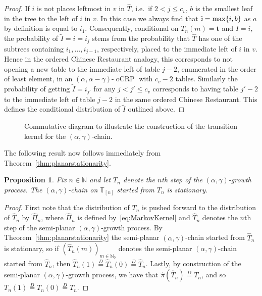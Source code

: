 \documentclass[a4paper, final]{amsart}
\theoremstyle{plain}
\newtheorem{prop}[thm]{Proposition}
\theoremstyle{definition}
\newcommand{\tree}[1][t]{\boldsymbol{#1}}
\newcommand{\That}[1][T]{\widehat{#1}}
\newcommand{\Thatspace}[1][\T]{\widehat{\boldsymbol{#1}}} %
\newcommand{\T}{\mathbb{T}}
\DeclareMathOperator{\tildei}{\tilde{\textit{\i}}}
\DeclareMathOperator{\ocrp}{oCRP}
\newcommand{\nin}{{n \in \mathbb{N}}}
\newcommand{\deq}{\stackrel{D}{=}}
\newcommand{\N}{\mathbb{N}}
\begin{document}
\begin{proof}
  If $i$ is not places leftmost in $v$ in $\That$, i.e.\ if $2 < j \leq c_v$, $b$ is the smallest leaf in the tree to the left of $i$ in $v$.
  In this case we always find that $\tildei = \max \{i, b\}$ as $a$ by definition is equal to $i_1$.
  Consequently, conditional on $T_n(m) = \tree$ and $I = i$, the probability of $\tilde{I} = i = i_j$ stems from the probability that $\That$ has one of the subtrees containing $i_1, \ldots, i_{j-1}$, respectively, placed to the immediate left of $i$ in $v$.
  Hence in the ordered Chinese Restaurant analogy, this corresponds to not opening a new table to the immediate left of table $j-2$, enumerated in the order of least element, in an $(\alpha, \alpha - \gamma)$-$\ocrp$ with $c_v - 2$ tables.
  Similarly the probability of getting $\tilde{I} = i_{j'}$ for any $j < j' \leq c_v$ corresponds to having table $j'-2$ to the immediate left of table $j-2$ in the same ordered Chinese Restaurant.
  This defines the conditional distribution of $\tilde{I}$ outlined above.
\end{proof}
\begin{figure}[t]
  \centering
  \caption{Commutative diagram to illustrate the construction of the transition kernel for the $(\alpha, \gamma)$-chain.}\label{fig:commutativediagram}
\end{figure}
%
The following result now follows immediately from Theorem~\ref{thm:planarstationarity}.
%
\begin{prop}\label{prop:stationaryMCnonplanar}
  Fix $\nin$ and let $T_n$ denote the $n$th step of the $(\alpha, \gamma)$-growth process.
  The $(\alpha, \gamma)$-chain on $\T_{[n]}$ started from $T_n$ is stationary.
\end{prop}
%
\begin{proof}
  First note that the distribution of $T_n$ is pushed forward to the distribution of $\That_n$ by $\hat{\Pi}_n$, where $\hat{\Pi}_n$ is defined by~\eqref{eq:MarkovKernel} and $\That_n$ denotes the $n$th step of the semi-planar $(\alpha, \gamma)$-growth process.
  By Theorem~\ref{thm:planarstationarity} the semi-planar $(\alpha, \gamma)$-chain started from $\That_n$ is stationary, so if ${\left( \That_n(m) \right)}_{m \in \N_0}$ denotes the semi-planar $(\alpha, \gamma)$-chain started from $\That_n$, then $\That_n(1) \deq \That_n(0) \deq \That_n$.
  Lastly, by construction of the semi-planar $(\alpha, \gamma)$-growth process, we have that $\hat{\pi} ( \That_n ) \deq T_n$, and so $T_n(1) \deq T_n(0) \deq T_n$.
\end{proof}
\end{document}
